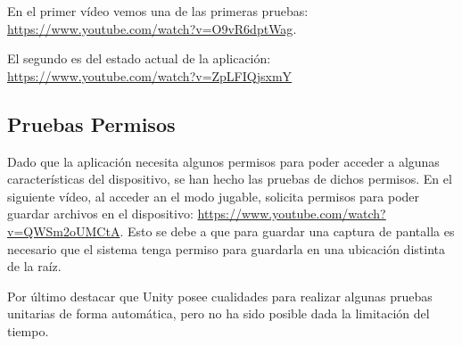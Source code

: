 En el primer vídeo vemos una de las primeras pruebas:\\ \url{https://www.youtube.com/watch?v=O9vR6dptWag}.

 El segundo es del estado actual de la aplicación:\\ \url{https://www.youtube.com/watch?v=ZpLFIQjsxmY}

\subsection{Pruebas Permisos}
Dado que la aplicación necesita algunos permisos para poder acceder a algunas características del dispositivo, se han hecho las pruebas de dichos permisos. En el siguiente vídeo, al acceder an el modo jugable, solicita permisos para poder guardar archivos en el dispositivo: \url{https://www.youtube.com/watch?v=QWSm2oUMCtA}. Esto se debe a que para guardar una captura de pantalla es necesario que el sistema tenga permiso para guardarla en una ubicación distinta de la raíz.




Por último destacar que Unity posee cualidades para realizar algunas pruebas unitarias de forma automática, pero no ha sido posible dada la limitación del tiempo.